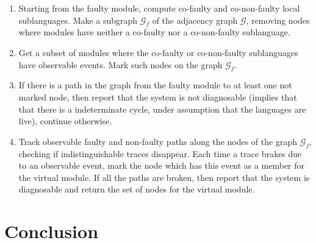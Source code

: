 \documentclass[a4paper, 10pt, conference]{ieeeconf}
\begin{document}
\begin{enumerate}
  \item Starting from the faulty module, compute co-faulty and co-non-faulty
  local sublanguages. Make a subgraph $\mathcal{G}_f$ of the adjacency graph
  $\mathcal{G}$, removing nodes where modules have neither a co-faulty nor a
  co-non-faulty sublanguage.
  
  \item Get a subset of modules where the co-faulty or co-non-faulty
  sublanguages have observable events. Mark such nodes on the graph
  $\mathcal{G}_f$.
  
  \item If there is a path in the graph from the faulty module to at least one
  not marked node, then report that the system is not diagnosable (implies that
  that there is a indeterminate cycle, under assumption that the languages are
  live), continue otherwise.
  
  \item Track observable faulty and non-faulty paths along the nodes of the
  graph $\mathcal{G}_f$, checking if indistinguishable traces disappear. Each
  time a trace brakes due to an observable event, mark the node which has this
  event as a member for the virtual module. If all the paths are broken, then
  report that the system is diagnosable and return the set of nodes for the
  virtual module.
\end{enumerate}


\section{Conclusion}
\label{sec:Conclusion}




\end{document}
